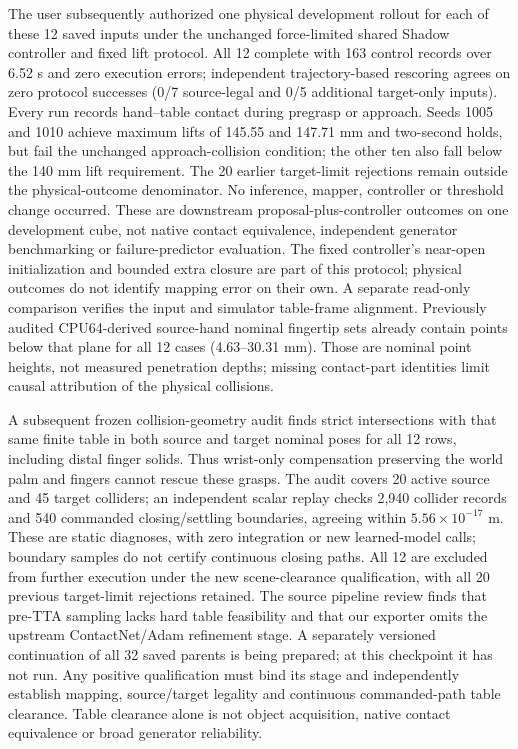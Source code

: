 \documentclass[10pt,letterpaper]{article}
\begin{document}
The user subsequently authorized one physical development rollout for each of
these 12 saved inputs under the unchanged force-limited shared Shadow controller
and fixed lift protocol. All 12 complete with 163 control records over 6.52 s
and zero execution errors; independent trajectory-based rescoring agrees on
zero protocol successes (0/7 source-legal and 0/5 additional target-only inputs).
Every run records hand--table contact during pregrasp or approach. Seeds 1005
and 1010 achieve maximum lifts of 145.55 and 147.71 mm and two-second holds,
but fail the unchanged approach-collision condition; the other ten also fall
below the 140 mm lift requirement. The 20 earlier target-limit rejections remain
outside the physical-outcome denominator. No inference, mapper, controller or
threshold change occurred. These are downstream proposal-plus-controller
outcomes on one development cube, not native contact equivalence, independent
generator benchmarking or failure-predictor evaluation. The fixed controller's
near-open initialization and bounded extra closure are part of this protocol;
physical outcomes do not identify mapping error on their own.
A separate read-only comparison verifies the input and simulator table-frame
alignment. Previously audited CPU64-derived source-hand nominal fingertip sets
already contain points below that plane for all 12 cases (4.63--30.31 mm).
Those are nominal point heights, not measured penetration depths; missing
contact-part identities limit causal attribution of the physical collisions.

A subsequent frozen collision-geometry audit finds strict intersections with
that same finite table in both source and target nominal poses for all 12 rows,
including distal finger solids. Thus wrist-only compensation preserving the
world palm and fingers cannot rescue these grasps. The audit covers 20 active
source and 45 target colliders; an independent scalar replay checks 2,940
collider records and 540 commanded closing/settling boundaries, agreeing within
$5.56\times10^{-17}$ m. These are static diagnoses, with zero integration or
new learned-model calls; boundary samples do not certify continuous closing
paths. All 12 are excluded from further execution under the new scene-clearance
qualification, with all 20 previous target-limit rejections retained. The source
pipeline review finds that pre-TTA sampling lacks hard table feasibility and
that our exporter omits the upstream ContactNet/Adam refinement stage. A
separately versioned continuation of all 32 saved parents is being prepared;
at this checkpoint it has not run. Any positive qualification must bind its
stage and independently establish mapping, source/target legality and continuous
commanded-path table clearance. Table clearance alone is not object acquisition,
native contact equivalence or broad generator reliability.
\end{document}

